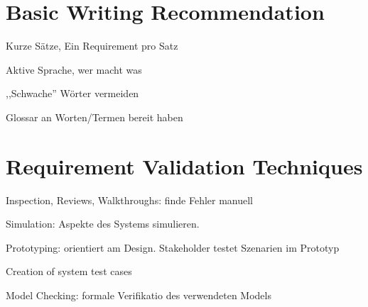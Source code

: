 \section{Basic Writing Recommendation}
\begin{compactitem}
    \item Kurze Sätze, Ein Requirement pro Satz
    \item Aktive Sprache, wer macht was
    \item ,,Schwache'' Wörter vermeiden
    \item Glossar an Worten/Termen bereit haben
\end{compactitem}

\section{Requirement Validation Techniques}
\begin{compactitem}
    \item Inspection, Reviews, Walkthroughs: finde Fehler manuell
    \item Simulation: Aspekte des Systems simulieren.
    \item Prototyping: orientiert am Design. Stakeholder testet Szenarien im
    Prototyp
    \item Creation of system test cases
    \item Model Checking: formale Verifikatio des verwendeten Models
\end{compactitem}
